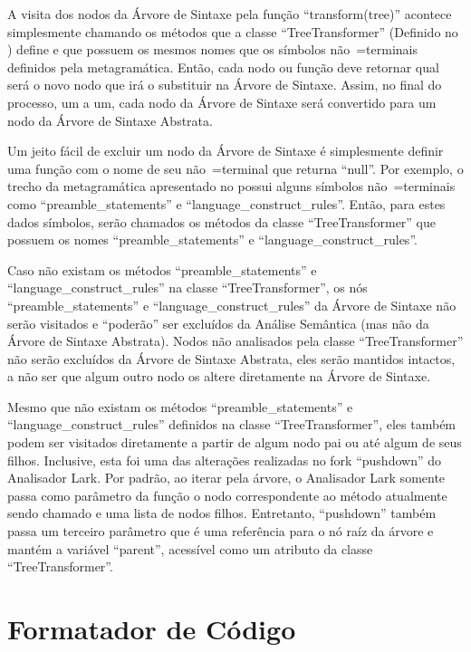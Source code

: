 A visita dos nodos da Árvore de Sintaxe pela função ``transform(tree)'' acontece simplesmente chamando os métodos que a classe ``TreeTransformer'' (Definido no ) define e
que possuem os mesmos nomes que os símbolos não~=terminais definidos pela metagramática.
Então,
cada nodo ou
função deve retornar qual será o novo nodo que irá o substituir na Árvore de Sintaxe.
Assim,
no final do processo,
um a um,
cada nodo da Árvore de Sintaxe será convertido para um nodo da Árvore de Sintaxe Abstrata.

Um jeito fácil de excluir um nodo da Árvore de Sintaxe é simplesmente definir uma função com o nome de seu não~=terminal que returna ``null''.
Por exemplo,
o trecho da metagramática apresentado no  possui alguns símbolos não~=terminais como ``preamble\_statements'' e
``language\_construct\_rules''. Então,
para estes dados símbolos,
serão chamados os métodos da classe ``TreeTransformer'' que possuem os nomes ``preamble\_statements'' e
``language\_construct\_rules''.

Caso não existam os métodos ``preamble\_statements'' e
``language\_construct\_rules'' na classe ``TreeTransformer'',
os nós ``preamble\_statements'' e
``language\_construct\_rules'' da Árvore de Sintaxe não serão visitados e
``poderão'' ser excluídos da Análise Semântica (mas não da Árvore de Sintaxe Abstrata).
Nodos não analisados pela classe ``TreeTransformer'' não serão excluídos da Árvore de Sintaxe Abstrata,
eles serão mantidos intactos,
a não ser que algum outro nodo os altere diretamente na Árvore de Sintaxe.

Mesmo que não existam os métodos ``preamble\_statements'' e
``language\_construct\_rules'' definidos na classe ``TreeTransformer'',
eles também podem ser visitados diretamente a partir de algum nodo pai ou
até algum de seus filhos.
Inclusive,
esta foi uma das alterações realizadas no fork ``pushdown'' do Analisador Lark.
Por padrão,
ao iterar pela árvore,
o Analisador Lark somente passa como parâmetro da função o nodo correspondente ao método atualmente sendo chamado e
uma lista de nodos filhos.
Entretanto,
``pushdown'' também passa um terceiro parâmetro que é uma referência para o nó raíz da árvore e
mantém a variável ``parent'',
acessível como um atributo da classe ``TreeTransformer''.


\section{Formatador de Código}

